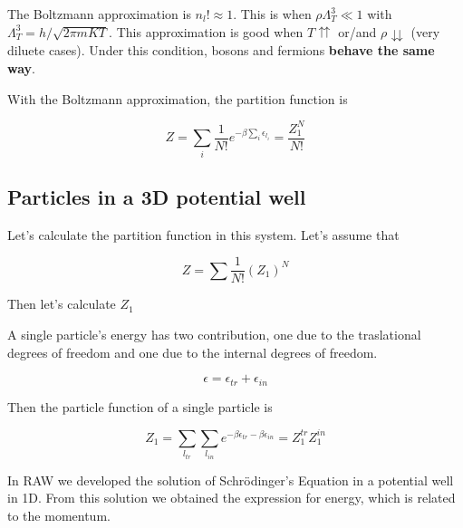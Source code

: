 \documentclass[12pt,a4paper]{report}
\newcommand{\esp}{\vspace{0.5cm}}
\begin{document}
	The Boltzmann approximation is $n_l! \approx 1$. This is when $\rho \Lambda_T^3 \ll 1$ with $\Lambda_T^3 = h/\sqrt{2\pi mKT}$. This approximation is good when $T\upuparrows$ or/and $\rho \downdownarrows$ (very diluete cases). Under this condition, bosons and fermions \textbf{behave the same way}.
	
	\esp
	
	\noindent With the Boltzmann approximation, the partition function is
	
	\esp
	
	\begin{equation}
		Z = \sum_i \frac{1}{N!} e^{-\beta \sum_i \epsilon_{l_i}} = \frac{Z_1^N}{N!}
	\end{equation}
	
	\subsection{Particles in a 3D potential well}
	
	\noindent Let's calculate the partition function in this system. Let's assume that
	
	\esp
	
	\begin{equation}
		Z = \sum \frac{1}{N!}(Z_1)^N
	\end{equation}
	
	\esp
	
	\noindent Then let's calculate $Z_1$
	
	\esp
	
	A single particle's energy has two contribution, one due to the traslational degrees of freedom and one due to the internal degrees of freedom.
	
	\esp
	
	\begin{equation}
		\epsilon = \epsilon_{tr} + \epsilon_{in}
	\end{equation}
	
	\esp
	
	\noindent Then the particle function of a single particle is
	
	\esp
	
	\begin{equation}
		Z_1 = \sum_{l_{tr}}\sum_{l_{in}} e^{-\beta \epsilon_{tr}-\beta \epsilon_{in}} = Z_1^{tr} Z_1^{in}
	\end{equation}
	
	\esp
	
	In RAW we developed the solution of Schrödinger's Equation in a potential well in 1D. From this solution we obtained the expression for energy, which is related to the momentum.
	
\end{document}
